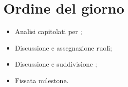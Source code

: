 \section{Ordine del giorno}
\begin{itemize}
	\item Analisi capitolati per \SdF{};
	\item Discussione e assegnazione ruoli;
	\item Discussione e suddivisione \NdP{};
	\item Fissata milestone.
\end{itemize}